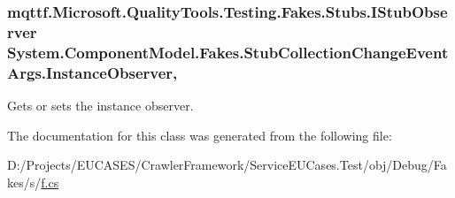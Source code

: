 \hypertarget{class_system_1_1_component_model_1_1_fakes_1_1_stub_collection_change_event_args_a76afad577cbbdf311c5c60ebdc779a14}{
\subsubsection[{Instance\-Observer}]{\setlength{\rightskip}{0pt plus 5cm}mqttf.\-Microsoft.\-Quality\-Tools.\-Testing.\-Fakes.\-Stubs.\-I\-Stub\-Observer System.\-Component\-Model.\-Fakes.\-Stub\-Collection\-Change\-Event\-Args.\-Instance\-Observer\hspace{0.3cm}{\ttfamily [get]}, {\ttfamily [set]}}}\label{class_system_1_1_component_model_1_1_fakes_1_1_stub_collection_change_event_args_a76afad577cbbdf311c5c60ebdc779a14}


Gets or sets the instance observer.



The documentation for this class was generated from the following file\-:\begin{DoxyCompactItemize}
\item 
D\-:/\-Projects/\-E\-U\-C\-A\-S\-E\-S/\-Crawler\-Framework/\-Service\-E\-U\-Cases.\-Test/obj/\-Debug/\-Fakes/s/\hyperlink{s_2f_8cs}{f.\-cs}\end{DoxyCompactItemize}
